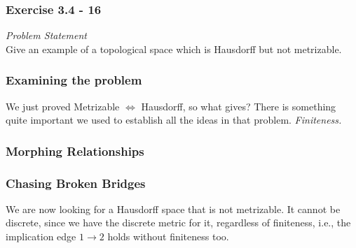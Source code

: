 
\begin{frame}
    \frametitle{Exercise 3.4 - 16}
    \textit{Problem Statement}\\
    Give an example of a topological space which is Hausdorff but not
    metrizable.
\end{frame}

\begin{frame}
    \frametitle{Examining the problem}

    We just proved Metrizable \(\Leftrightarrow\) Hausdorff, so what gives?
    \pause
    There is something quite important we used to establish all the ideas in
    that problem. \pause \emph{Finiteness.}

\end{frame}

\begin{frame}
    \frametitle{Morphing Relationships}
    \centering

\end{frame}

\begin{frame}
    \frametitle{Chasing Broken Bridges}

    We are now looking for a Hausdorff space that is not metrizable. It cannot
    be discrete, since we have the discrete metric for it, regardless of
    finiteness, i.e., the implication edge \(1\rightarrow 2\) holds without
    finiteness too.

\end{frame}


